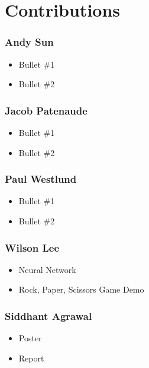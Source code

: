 \section{Contributions}

\subsubsection*{Andy Sun}
\begin{itemize}
\item Bullet \#1
\item Bullet \#2
\end{itemize}

\subsubsection*{Jacob Patenaude}
\begin{itemize}
\item Bullet \#1
\item Bullet \#2
\end{itemize}

\subsubsection*{Paul Westlund}
\begin{itemize}
\item Bullet \#1
\item Bullet \#2
\end{itemize}

\subsubsection*{Wilson Lee}
\begin{itemize}
\item Neural Network
\item Rock, Paper, Scissors Game Demo
\end{itemize}

\subsubsection*{Siddhant Agrawal}
\begin{itemize}
\item Poster
\item Report
\end{itemize}
